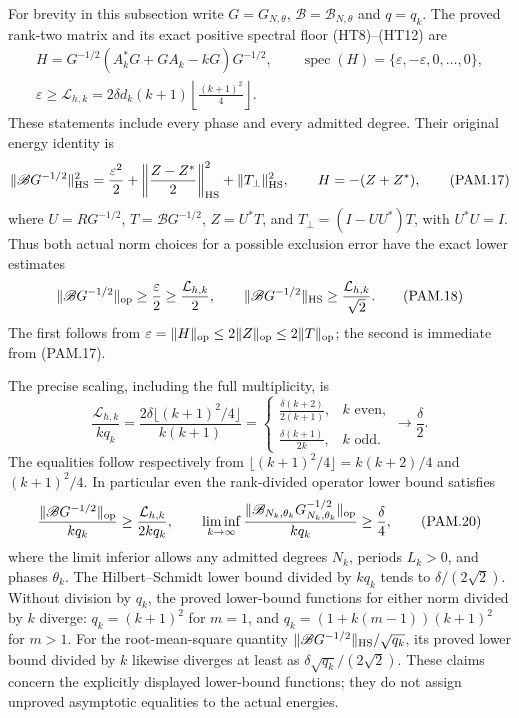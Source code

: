 For brevity in this subsection write \(G=G_{N,\theta}\),
\(\mathscr B=\mathscr B_{N,\theta}\) and \(q=q_k\).
The proved rank-two matrix and its exact positive spectral floor
(HT8)--(HT12) are
\[
 \begin{gathered}
 H=G^{-1/2}(A_k^*G+GA_k-kG)G^{-1/2},\qquad
 \operatorname{spec}(H)=\{\varepsilon,-\varepsilon,0,\ldots,0\},\\
 \varepsilon\ge
 \mathcal L_{h,k}
 =2\delta d_k(k+1)\left\lfloor\frac{(k+1)^2}{4}\right\rfloor .
 \end{gathered}
 \tag{PAM.16}\label{CFStage:eq:pam-rankfloor}
\]
These statements include every phase and every admitted degree.
Their original energy identity is
\[
 \|\mathscr B G^{-1/2}\|_{\rm HS}^2
 =\frac{\varepsilon^2}{2}
  +\left\|\frac{Z-Z^*}{2}\right\|_{\rm HS}^2
  +\|T_\perp\|_{\rm HS}^2,\qquad
 H=-(Z+Z^*),
 \tag{PAM.17}\label{CFStage:eq:pam-energy}
\]
where \(U=RG^{-1/2}\), \(T=\mathscr B G^{-1/2}\),
\(Z=U^*T\), and \(T_\perp=(I-UU^*)T\), with \(U^*U=I\).
Thus both actual norm choices for a possible exclusion error have
the exact lower estimates
\[
 \|\mathscr B G^{-1/2}\|_{\rm op}
       \ge\frac{\varepsilon}{2}\ge\frac{\mathcal L_{h,k}}2,
 \qquad
 \|\mathscr B G^{-1/2}\|_{\rm HS}
       \ge\frac{\mathcal L_{h,k}}{\sqrt2}.
 \tag{PAM.18}\label{CFStage:eq:pam-normfloors}
\]
The first follows from
\(\varepsilon=\|H\|_{\rm op}\le2\|Z\|_{\rm op}
\le2\|T\|_{\rm op}\); the second is immediate from (PAM.17).

The precise scaling, including the full multiplicity, is
\[
 \frac{\mathcal L_{h,k}}{kq_k}
 =\frac{2\delta\lfloor(k+1)^2/4\rfloor}{k(k+1)}
 =
 \begin{cases}
  \displaystyle\frac{\delta(k+2)}{2(k+1)},&k\text{ even},\\[4pt]
  \displaystyle\frac{\delta(k+1)}{2k},&k\text{ odd}.
 \end{cases}
 \longrightarrow\frac\delta2 .
 \tag{PAM.19}\label{CFStage:eq:pam-scaling}
\]
The equalities follow respectively from
\(\lfloor(k+1)^2/4\rfloor=k(k+2)/4\) and \((k+1)^2/4\).
In particular even the rank-divided operator lower bound satisfies
\[
 \frac{\|\mathscr B G^{-1/2}\|_{\rm op}}{kq_k}
 \ge\frac{\mathcal L_{h,k}}{2kq_k},\qquad
 \liminf_{k\to\infty}
 \frac{\|\mathscr B_{N_k,\theta_k}G_{N_k,\theta_k}^{-1/2}\|_{\rm op}}
      {kq_k}\ge\frac\delta4 ,
 \tag{PAM.20}\label{CFStage:eq:pam-opscaling}
\]
where the limit inferior allows any admitted degrees \(N_k\), periods
\(L_k>0\), and phases \(\theta_k\).
The Hilbert--Schmidt lower bound divided by \(kq_k\)
tends to \(\delta/(2\sqrt2)\).
Without division by \(q_k\), the proved lower-bound functions
for either norm divided by \(k\) diverge: \(q_k=(k+1)^2\) for
\(m=1\), and \(q_k=(1+k(m-1))(k+1)^2\) for \(m>1\).
For the root-mean-square quantity
\(\|\mathscr B G^{-1/2}\|_{\rm HS}/\sqrt{q_k}\),
its proved lower bound divided by \(k\) likewise diverges at
least as \(\delta\sqrt{q_k}/(2\sqrt2)\).
These claims concern the explicitly displayed lower-bound
functions; they do not assign unproved asymptotic equalities
to the actual energies.

